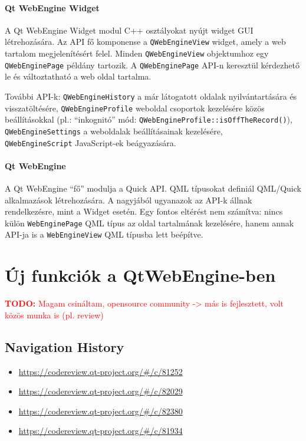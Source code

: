 \documentclass[12pt]{report}
\let\origurl\url
\renewcommand{\url}[1]{%
    \textcolor{blue}{\origurl{#1}}
}
\newcommand{\todo}[1]{%
    \textcolor{red}{\textbf{TODO:} #1}
}
\newcommand{\gerrit}[1]{%
    \textcolor{qtgreen}{\origurl{https://codereview.qt-project.org/\#/c/#1}}
}
\begin{document}
\subsubsection{Qt WebEngine Widget}
A Qt WebEngine Widget modul C++ osztályokat nyújt widget GUI létrehozására. Az API
fő komponense a \texttt{QWebEngineView} widget, amely a web tartalom megjelenítésért felel.
Minden \texttt{QWebEngineView} objektumhoz egy \texttt{QWebEnginePage} példány tartozik.
A \texttt{QWebEnginePage} API-n keresztül kérdezhető le és változtatható a web oldal
tartalma.

További API-k: \texttt{QWebEngineHistory} a már látogatott oldalak nyilvántartására és
visszatöltésére, \texttt{QWebEngineProfile} weboldal csoportok kezelésére közös
beállításokkal (pl.: ``inkognitó'' mód: \texttt{QWebEngineProfile::isOffTheRecord()}),
\texttt{QWebEngineSettings} a weboldalak beállításainak kezelésére, \\
\texttt{QWebEngineScript} JavaScript-ek beágyazására.

\subsubsection{Qt WebEngine}
A Qt WebEngine ``fő'' modulja a Quick API. QML típusokat definiál QML/Quick alkalmazások
létrehozására. A nagyjából ugyanazok az API-k állnak rendelkezésre, mint a Widget esetén.
Egy fontos eltérést nem számítva: nincs külön \texttt{WebEnginePage} QML típus az oldal
tartalmának kezelésére, hanem annak API-ja is a \texttt{WebEngineView} QML típusba lett
beépítve.


\chapter{Új funkciók a QtWebEngine-ben}
\label{chap:features}

\todo{Magam csináltam, opensource community -> más is fejlesztett, volt közös munka is
(pl. review)}

\section{Navigation History}

\begin{center}
    \begin{reviewbox}
        \begin{itemize}
            \renewcommand{\labelitemi}{\textcolor{qtgreen}{$\blacktriangleright$}}
            \item \gerrit{81252}
            \item \gerrit{82029}
            \item \gerrit{82380}
            \item \gerrit{81934}
        \end{itemize}
    \end{reviewbox}
\end{center}
\end{document}
